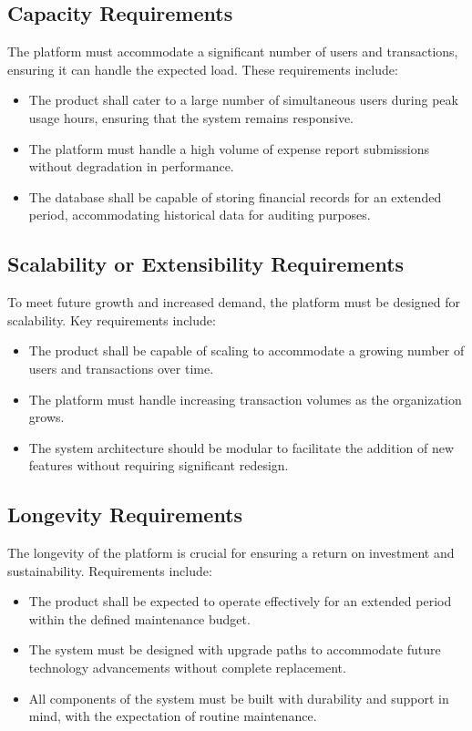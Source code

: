 \documentclass[12pt]{article}
\begin{document}
\subsection{Capacity Requirements}
The platform must accommodate a significant number of users and transactions, ensuring it can handle the expected load. These requirements include:

\begin{itemize}
    \item The product shall cater to a large number of simultaneous users during peak usage hours, ensuring that the system remains responsive.
    \item The platform must handle a high volume of expense report submissions without degradation in performance.
    \item The database shall be capable of storing financial records for an extended period, accommodating historical data for auditing purposes.
\end{itemize}

\subsection{Scalability or Extensibility Requirements}
To meet future growth and increased demand, the platform must be designed for scalability. Key requirements include:

\begin{itemize}
    \item The product shall be capable of scaling to accommodate a growing number of users and transactions over time.
    \item The platform must handle increasing transaction volumes as the organization grows.
    \item The system architecture should be modular to facilitate the addition of new features without requiring significant redesign.
\end{itemize}

\subsection{Longevity Requirements}
The longevity of the platform is crucial for ensuring a return on investment and sustainability. Requirements include:

\begin{itemize}
    \item The product shall be expected to operate effectively for an extended period within the defined maintenance budget.
    \item The system must be designed with upgrade paths to accommodate future technology advancements without complete replacement.
    \item All components of the system must be built with durability and support in mind, with the expectation of routine maintenance.
\end{itemize}
\end{document}
